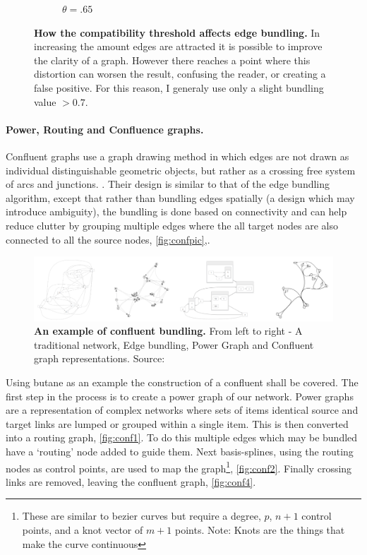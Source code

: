 \begin{figure}[H]
\begin{subfigure}[b]{.49\textwidth}
 \caption{$\theta = .65$}
 \end{subfigure}
        \caption{\textbf{How the compatibility threshold affects edge bundling.} In increasing the amount edges are attracted it is possible to improve the clarity of a graph. However there reaches a point where this distortion can worsen the result, confusing the reader, or creating a false positive. For this reason, I generaly use only a slight bundling value $> 0.7$.}
      \label{fig:edgebundling}
\end{figure}

\paragraph{Power, Routing and Confluence graphs.}

Confluent graphs use a graph drawing method in which edges are not drawn as individual distinguishable geometric objects, but rather as a crossing free system of arcs and junctions. \citep{confluient19}. Their design is similar to that of the edge bundling algorithm, except that rather than bundling edges spatially (a design which may introduce ambiguity), the bundling is done based on connectivity and can help reduce clutter by grouping multiple edges where the all target nodes are also connected to all the source nodes, \autoref{fig:confpic},\citep{confpic}. 

\begin{figure}[H]
     \centering
     \includegraphics[width=.9\textwidth]{figures_c1/layout/confluent/example.png}
        \caption{\textbf{An example of confluent bundling. } From left to right -  A traditional network, Edge bundling, Power Graph and Confluent graph representations. Source: \citep{confpic}}
      \label{fig:confpic}
\end{figure}

Using butane as an example the construction of a confluent shall be covered. The first step in the process is to create
a power graph of our network. Power graphs are a representation of complex networks where sets of items identical source and target links are lumped or grouped within a single item. This is then converted into a routing graph, \autoref{fig:conf1}. To do this multiple edges which may be bundled have a `routing' node added to guide them. Next basis-splines, using the routing nodes as control points, are used to map the graph\footnote{These are similar to bezier curves but require a degree, $p$, $n+1$ control points, and a knot vector of $m+1$ points. Note: Knots are the things that make the curve continuous }, \autoref{fig:conf2}. Finally crossing links are removed, leaving the confluent graph, \autoref{fig:conf4}. 

